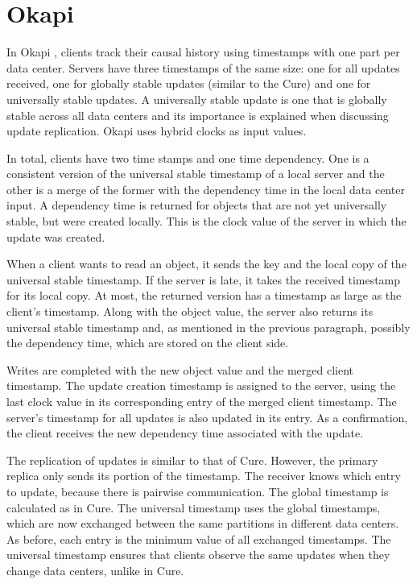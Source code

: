 \section{Okapi}
\label{sec:soa:okapi}

In Okapi \cite{didona2017okapi}, clients track their causal history using timestamps with one part per data center. Servers have three timestamps of the same size: one for all updates received, one for globally stable updates (similar to the Cure) and one for universally stable updates. A universally stable update is one that is globally stable across all data centers and its importance is explained when discussing update replication. Okapi uses hybrid clocks as input values. 

In total,  clients have two time stamps and one time dependency. One is a consistent version of the universal stable timestamp of a local server and the other is a merge of the former with the dependency time in the local data center input. A dependency time is returned for objects that are not yet universally stable, but were created locally. This is the clock value of the server in which the update was created. 

When a client wants to read an object, it sends the key and the local copy of the universal stable timestamp. If the server is late, it takes the received timestamp for its local copy. At most, the returned version has a timestamp as large as the client's timestamp. Along with the object value, the server also returns its universal stable timestamp and, as mentioned in the previous paragraph, possibly the dependency time, which are stored on the client side. 

Writes are completed with the new object value and the merged client timestamp. The update creation timestamp is assigned to the server, using the last clock value in its corresponding entry of the merged client timestamp. The server's timestamp for all updates is also updated in its entry. As a confirmation, the client receives the new dependency time associated with the update. 

The replication of updates is similar to that of Cure. However, the primary replica only sends its portion of the timestamp. The receiver knows which entry to update, because there is pairwise communication. The global timestamp is calculated as in Cure. The universal timestamp uses the global timestamps, which are now exchanged between the same partitions in different data centers. As before, each entry is the minimum value of all exchanged timestamps. The universal timestamp ensures that clients observe the same updates when they change data centers, unlike in Cure. 

